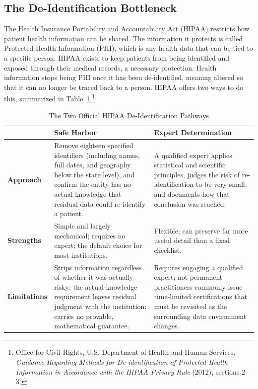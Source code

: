 \documentclass[11pt]{article}
\begin{document}
\subsection{The De-Identification Bottleneck}\label{sec:bottleneck}

The Health Insurance Portability and Accountability Act (HIPAA) restricts how patient health information can be shared. The information it protects is called Protected Health Information (PHI), which is any health data that can be tied to a specific person. HIPAA exists to keep patients from being identified and exposed through their medical records, a necessary protection. Health information stops being PHI once it has been de-identified, meaning altered so that it can no longer be traced back to a person. HIPAA offers two ways to do this, summarized in Table~\ref{tab:methods}.\footnote{Office for Civil Rights, U.S. Department of Health and Human Services, \textit{Guidance Regarding Methods for De-identification of Protected Health Information in Accordance with the HIPAA Privacy Rule} (2012), sections 2--3.} 

\begin{table}[H]
\centering
\renewcommand{\arraystretch}{1.4}
\begin{tabular}{>{\raggedright\arraybackslash}p{} >{\raggedright\arraybackslash}p{} >{\raggedright\arraybackslash}p{}}
\hline
 & \textbf{Safe Harbor} & \textbf{Expert Determination} \\
\hline
\textbf{Approach} & Remove eighteen specified identifiers (including names, full dates, and geography below the state level), and confirm the entity has no actual knowledge that residual data could re-identify a patient. & A qualified expert applies statistical and scientific principles, judges the risk of re-identification to be very small, and documents how that conclusion was reached. \\
\textbf{Strengths} & Simple and largely mechanical; requires no expert; the default choice for most institutions. & Flexible; can preserve far more useful detail than a fixed checklist. \\
\textbf{Limitations} & Strips information regardless of whether it was actually risky; the actual-knowledge requirement leaves residual judgment with the institution; carries no provable, mathematical guarantee. & Requires engaging a qualified expert; not permanent---practitioners commonly issue time-limited certifications that must be revisited as the surrounding data environment changes. \\
\hline
\end{tabular}
\caption{The Two Official HIPAA De-Identification Pathways}
\label{tab:methods}
\end{table}
\end{document}
